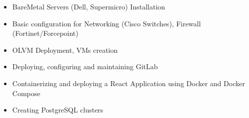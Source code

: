 \documentclass[10pt,a4paper,ragged2e,withhyper]{altacv}
\begin{document}
\begin{paracol}{2}
\begin{itemize}
\item BareMetal Servers (Dell, Supermicro) \newline Installation
\item Basic configuration for Networking (Cisco Switches), Firewall (Fortinet/Forcepoint)
\item OLVM Deployment, VMs creation
\item Deploying, configuring and maintaining GitLab
\item Containerizing and deploying a React \newline Application using Docker and Docker Compose
\item Creating PostgreSQL clusters
\end{itemize}






\end{paracol}
\end{document}
